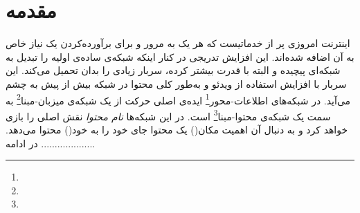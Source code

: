 \chapter{مقدمه}

اینترنت امروزی پر از خدماتیست که هر یک به مرور و برای برآورده‌کردن یک نیاز خاص به آن اضافه شده‌اند. این افزایش تدریجی در کنار اینکه شبکه‌ی ساده‌ی اولیه را تبدیل به شبکه‌ای پیچیده و البته با قدرت بیشتر کرده، سربار‌ زیادی را بدان تحمیل می‌کند. این سربار با افزایش استفاده از ویدئو و به‌طور کلی محتوا در شبکه بیش از پیش به چشم می‌آید. در شبکه‌های اطلاعات-محور\footnote{} ایده‌ی اصلی حرکت از یک شبکه‌ی میزبان-مبنا\footnote{} به سمت یک شبکه‌ی محتوا-مبنا\footnote{} است. در این شبکه‌ها \textit{نام محتوا} نقش اصلی را بازی خواهد کرد و به دنبال آن اهمیت مکان() یک محتوا جای خود را به خود() محتوا می‌دهد. در ادامه ....................


